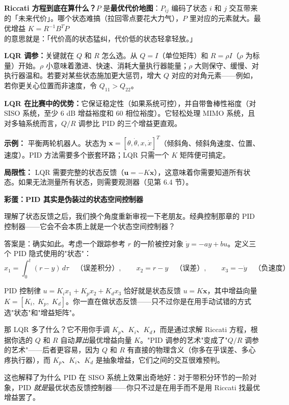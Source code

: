 \textbf{Riccati 方程到底在算什么？}$P$ 是\textbf{最优代价地图}：$P_{ij}$ 编码了状态 $i$ 和 $j$ 交互带来的「未来代价」。哪个状态难搞（拉回零点要花大力气），$P$ 里对应的元素就大。最优增益 $K = R^{-1}B^T P$ 的意思就是：「代价高的状态猛纠，代价低的状态轻拿轻放。」

\textbf{LQR 调参：}关键就在 $Q$ 和 $R$ 怎么选。从 $Q = I$（单位矩阵）和 $R = \rho I$（$\rho$ 为标量）开始。$\rho$ 小意味着激进、快速、消耗大量执行器能量；$\rho$ 大则保守、缓慢、对执行器温和。若要对某些状态施加更大惩罚，增大 $Q$ 对应的对角元素——例如，若你更关心位置而非速度，令 $Q_{11} > Q_{22}$。

\textbf{LQR 在比赛中的优势：}它保证稳定性（如果系统可控），并自带鲁棒性裕度（对 SISO 系统，至少 6 dB 增益裕度和 60\textdegree{} 相位裕度）。它轻松处理 MIMO 系统，且对多轴系统而言，$Q/R$ 调参比 PID 的三个增益更直观。

\textbf{示例：} 平衡两轮机器人。状态为 $\mathbf{x} = [\theta, \dot{\theta}, x, \dot{x}]^T$（倾斜角、倾斜角速度、位置、速度）。PID 方法需要多个嵌套环路；LQR 只需一个 $K$ 矩阵便可搞定。

\textbf{局限性：} LQR 需要完整的状态反馈（$\mathbf{u} = -K\mathbf{x}$），这意味着你需要知道所有状态。如果无法测量所有状态，则需要观测器（见第 6.4 节）。

\vspace{0.5em}
\begin{mdframed}[linewidth=1pt, innertopmargin=10pt, innerbottommargin=10pt]
\textbf{彩蛋：PID 其实是伪装过的状态空间控制器}

\vspace{0.3em}
理解了状态反馈之后，我们换个角度重新审视一下老朋友。经典控制那章的 PID 控制器——它会不会本质上就是一个状态空间控制器？

答案是：确实如此。考虑一个跟踪参考 $r$ 的一阶被控对象 $\dot{y} = -ay + bu$。定义三个 PID 隐式使用的"状态"：
\[
x_1 = \int_0^t (r - y)\,d\tau \quad \text{（误差积分）}, \qquad
x_2 = r - y \quad \text{（误差）}, \qquad
x_3 = -\dot{y} \quad \text{（负速度）}
\]

PID 控制律 $u = K_i x_1 + K_p x_2 + K_d x_3$ 恰好就是状态反馈 $u = K \mathbf{x}$，其中增益向量 $K = [K_i, \; K_p, \; K_d]$。你一直在做状态反馈——只不过你是在用手动试错的方式选"状态"和"增益矩阵"。

那 LQR 多了什么？它不用你手调 $K_p$、$K_i$、$K_d$，而是通过求解 Riccati 方程，根据你选的 $Q$ 和 $R$ 自动\textit{算出}最优增益向量 $K$。"PID 调参的艺术"变成了"$Q/R$ 调参的艺术"——后者更容易，因为 $Q$ 和 $R$ 有直接的物理含义（你多在乎误差、多心疼执行器），而 $K_p$、$K_i$、$K_d$ 是抽象增益，它们之间的交互很难预判。

这也解释了为什么 PID 在 SISO 系统上效果出奇地好：对于带积分环节的一阶对象，PID \textit{就是}最优状态反馈控制器——你只不过是在用手而不是用 Riccati 找最优增益罢了。
\end{mdframed}

